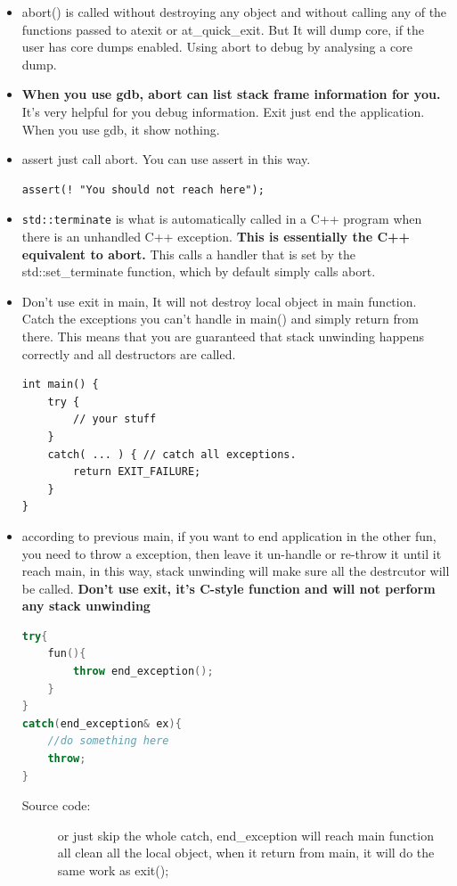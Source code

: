 \documentclass[a4paper,11pt,twoside]{book}
\begin{document}
\begin{itemize}
	\item abort() is called without destroying any object and without calling any of the functions passed to atexit or at\_quick\_exit. But It will dump core, if the user has core dumps enabled. Using abort to debug by analysing a core dump.
	
	\item \textbf{When you use gdb, abort can list stack frame information for you.} It's very helpful for you debug information.  Exit just end the application. When you use gdb, it show nothing.
	
	
	\item assert just call abort. You can use assert in this way.
\begin{lstlisting}[numbers=none]
assert(! "You should not reach here");
\end{lstlisting}
	
	\item \texttt{std::terminate} is what is automatically called in a C++ program when there is an unhandled C++ exception. \textbf{This is essentially the C++ equivalent to abort.} This calls a handler that is set by the std::set\_terminate function, which by default simply calls abort.
	
	\item Don't use exit in main, It will not destroy local object in main function. Catch the exceptions you can't handle in main() and simply return from there. This means that you are guaranteed that stack unwinding happens correctly and all destructors are called.
\begin{lstlisting}[numbers=none]
int main() {
	try {
		// your stuff
	}
	catch( ... ) { // catch all exceptions.
		return EXIT_FAILURE;
	}
}
	\end{lstlisting}
	
	\item according to previous main, if you want to end application in the other fun, you need to throw a exception, then leave it un-handle or re-throw it until it reach main, in this way, stack unwinding will make sure all the destrcutor will be called. \textbf{Don't use exit, it's C-style function and will not perform any stack unwinding}
\begin{lstlisting}[frame=single, language=c++]
try{
	fun(){
		throw end_exception();
	}
}
catch(end_exception& ex){
	//do something here
	throw;
}
\end{lstlisting}
\begin{description}
	\item[Source code:] or just skip the whole catch, end\_exception will reach main function all clean all the local object, when it return from main, it will do the same work as exit();
\end{description}
	
\end{itemize}
\end{document}
